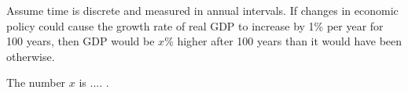
\bol
	        
    \li Assume time is discrete and measured in annual intervals. If changes in economic policy could cause the growth rate of real GDP to increase by 1\% per year for 100 years, then GDP would be $x$\% higher after 100 years than it would have been otherwise.

    The number $x$ is .... .
     
		\bol


                   \mcqtrue
                  
		\eol


    
\eol
